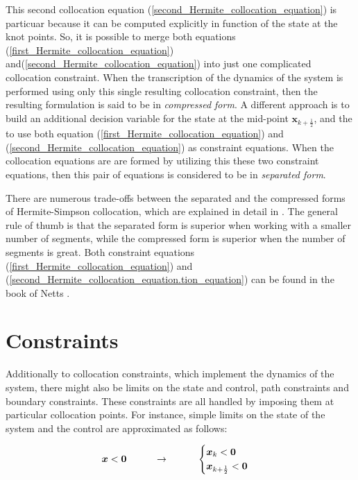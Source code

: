 \documentclass{thesisreport}
\begin{document}
  This second collocation equation (\ref{second_Hermite_collocation_equation}) is particuar because it can be computed explicitly in function of the state at the knot points. So, it is possible to merge both equations  (\ref{first_Hermite_collocation_equation}) and(\ref{second_Hermite_collocation_equation})  into just one complicated collocation constraint. When the transcription of the dynamics of the system is performed using only this single resulting collocation constraint, then the resulting formulation is said to be in \textit{compressed form}. A different approach is to build an additional decision variable for the state at the mid-point $\bm{x}_{k+\frac{1}{2}}$, and the to use both equation (\ref{first_Hermite_collocation_equation})
  and (\ref{second_Hermite_collocation_equation})
  as constraint equations. When the collocation equations are are formed by utilizing this these two constraint equations, then this pair of equations is considered to be in \textit{separated form}. 
  
  There are numerous trade-offs between the separated and the compressed forms of Hermite-Simpson collocation, which are explained in detail in \cite{Betts2010}. The general rule of thumb is that the separated form is superior when working with a smaller number of segments, while the compressed form is superior when the number of segments is great. Both constraint equations (\ref{first_Hermite_collocation_equation})
and (\ref{second_Hermite_collocation_equation.tion_equation})  can be found in the book of Netts \cite{Betts2010}.



\section{Constraints}


Additionally to collocation constraints, which implement the dynamics of the system, there might also be limits on the state and control, path constraints and boundary constraints. These constraints are all handled by imposing them at particular collocation points. For instance, simple limits on the state of the system and the control are approximated as follows:

\begin{equation}
\bm{x}<\bm{0} \text{\hspace{1cm}}\rightarrow  \text{\hspace{1cm}} \begin{cases}
\bm{x}_k <\bm{0} \\
\bm{x}_{k+\frac{1}{2}}<\bm{0}
\end{cases}
\end{equation}
\end{document}
